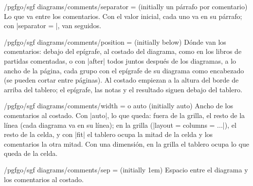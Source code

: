 
\begin{key}{/pgfgo/sgf diagrams/comments/separator =  (initially un párrafo por comentario)}
	Lo que va entre los comentarios. Con el valor inicial, cada uno va en su párrafo; con |separator = {\quad}|, van seguidos.

	\begin{codeexample}
	\end{codeexample}
\end{key}

\begin{key}{/pgfgo/sgf diagrams/comments/position =  (initially below)}
	Dónde van los comentarios: debajo del epígrafe, al costado del diagrama, como en los libros de partidas comentadas, o con |after| todos juntos después de los diagramas, a lo ancho de la página, cada grupo con el epígrafe de su diagrama como encabezado (se pueden cortar entre páginas). Al costado empiezan a la altura del borde de arriba del tablero; el epígrafe, las notas y el resultado siguen debajo del tablero.

	\begin{codeexample}
	\end{codeexample}
\end{key}

\begin{key}{/pgfgo/sgf diagrams/comments/width =  o auto (initially auto)}
	Ancho de los comentarios al costado. Con |auto|, lo que queda: fuera de la grilla, el resto de la línea (cada diagrama va en su línea); en la grilla (|layout = {columns = ...}|), el resto de la celda, y con |fit| el tablero ocupa la mitad de la celda y los comentarios la otra mitad. Con una dimensión, en la grilla el tablero ocupa lo que queda de la celda.
\end{key}

\begin{key}{/pgfgo/sgf diagrams/comments/sep =  (initially 1em)}
	Espacio entre el diagrama y los comentarios al costado.

	\begin{codeexample}
	\end{codeexample}
\end{key}

